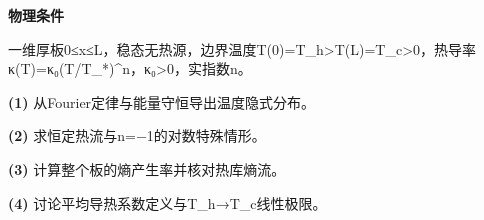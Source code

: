 \textbf{物理条件}\par 一维厚板0≤x≤L，稳态无热源，边界温度T(0)=T\_h>T(L)=T\_c>0，热导率κ(T)=κ₀(T/T\_*)\textasciicircum{}n，κ₀>0，实指数n。
\par\noindent\textbf{(1)} 从Fourier定律与能量守恒导出温度隐式分布。
\par\noindent\textbf{(2)} 求恒定热流与n=−1的对数特殊情形。
\par\noindent\textbf{(3)} 计算整个板的熵产生率并核对热库熵流。
\par\noindent\textbf{(4)} 讨论平均导热系数定义与T\_h→T\_c线性极限。
